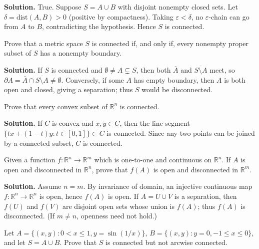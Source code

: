 \noindent\textbf{Solution.}
True. Suppose $S=A\cup B$ with disjoint nonempty closed sets. Let $\delta=\mathrm{dist}(A,B)>0$ (positive by compactness). Taking $\varepsilon<\delta$, no $\varepsilon$-chain can go from $A$ to $B$, contradicting the hypothesis. Hence $S$ is connected.
\medskip

\begin{problembox}
Prove that a metric space $S$ is connected if, and only if, every nonempty proper subset of $S$ has a nonempty boundary.
\end{problembox}

\noindent\textbf{Solution.}
If $S$ is connected and $\emptyset\ne A\subsetneq S$, then both $\overline{A}$ and $\overline{S\setminus A}$ meet, so $\partial A=\overline{A}\cap\overline{S\setminus A}\ne\emptyset$. Conversely, if some $A$ has empty boundary, then $A$ is both open and closed, giving a separation; thus $S$ would be disconnected.
\medskip

\begin{problembox}
Prove that every convex subset of $\mathbb{R}^n$ is connected.
\end{problembox}

\noindent\textbf{Solution.}
If $C$ is convex and $x,y\in C$, then the line segment $\{tx+(1-t)y: t\in[0,1]\}\subset C$ is connected. Since any two points can be joined by a connected subset, $C$ is connected.
\medskip

\begin{problembox}
Given a function $f : \mathbb{R}^n \to \mathbb{R}^m$ which is one-to-one and continuous on $\mathbb{R}^n$. If $A$ is open and disconnected in $\mathbb{R}^n$, prove that $f(A)$ is open and disconnected in $\mathbb{R}^m$.
\end{problembox}

\noindent\textbf{Solution.}
Assume $n=m$. By invariance of domain, an injective continuous map $f:\mathbb{R}^n\to\mathbb{R}^n$ is open, hence $f(A)$ is open. If $A=U\cup V$ is a separation, then $f(U)$ and $f(V)$ are disjoint open sets whose union is $f(A)$; thus $f(A)$ is disconnected. (If $m\ne n$, openness need not hold.)
\medskip

\begin{problembox}
Let $A = \{(x, y) : 0 < x \leq 1, y = \sin(1/x)\}$, $B = \{(x, y) : y = 0, -1 \leq x \leq 0\}$, and let $S = A \cup B$. Prove that $S$ is connected but not arcwise connected.
\end{problembox}

